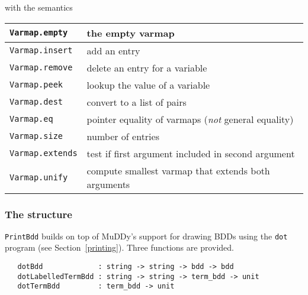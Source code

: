 \documentclass[12pt]{book}
\renewcommand{\t}[1]{\mbox{\tt #1}}
\newcommand{\Muddy}{MuDDy{}}
\begin{document}
with the semantics

\bigskip

\begin{tabular}{|l|l|} \hline
\t{Varmap.empty} &    the empty varmap \\ \hline
\t{Varmap.insert} &   add an entry \\ \hline
\t{Varmap.remove} &   delete an entry for a variable \\ \hline
\t{Varmap.peek} &     lookup the value of a variable \\ \hline
\t{Varmap.dest} &     convert to a list of pairs \\ \hline
\t{Varmap.eq} &       pointer equality of varmaps ({\it not} general equality) \\ \hline
\t{Varmap.size} &     number of entries \\ \hline
\t{Varmap.extends} &  test if first argument included in second argument\\ \hline
\t{Varmap.unify} &  compute smallest varmap that extends both arguments\\ \hline
\end{tabular}

\subsubsection{The structure }\label{PrintBdd}

\t{PrintBdd} builds on top of \Muddy's support for drawing BDDs using the \t{dot}
program (see Section~\ref{printing}). Three functions are provided.

\begin{verbatim}
   dotBdd             : string -> string -> bdd -> bdd
   dotLabelledTermBdd : string -> string -> term_bdd -> unit
   dotTermBdd         : term_bdd -> unit
\end{verbatim}
\end{document}
